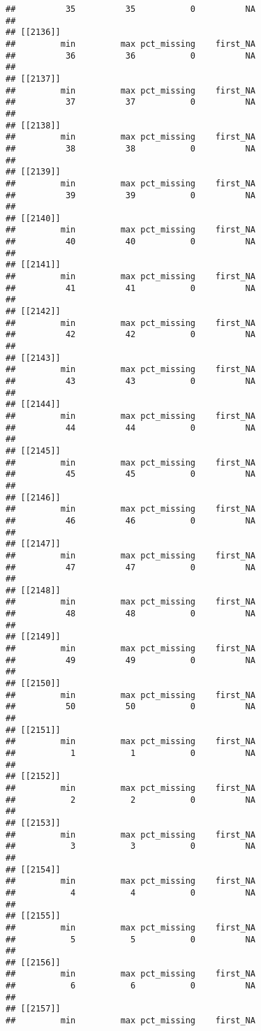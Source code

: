 \documentclass[
]{article}
\begin{document}
\begin{verbatim}
##          35          35           0          NA 
## 
## [[2136]]
##         min         max pct_missing    first_NA 
##          36          36           0          NA 
## 
## [[2137]]
##         min         max pct_missing    first_NA 
##          37          37           0          NA 
## 
## [[2138]]
##         min         max pct_missing    first_NA 
##          38          38           0          NA 
## 
## [[2139]]
##         min         max pct_missing    first_NA 
##          39          39           0          NA 
## 
## [[2140]]
##         min         max pct_missing    first_NA 
##          40          40           0          NA 
## 
## [[2141]]
##         min         max pct_missing    first_NA 
##          41          41           0          NA 
## 
## [[2142]]
##         min         max pct_missing    first_NA 
##          42          42           0          NA 
## 
## [[2143]]
##         min         max pct_missing    first_NA 
##          43          43           0          NA 
## 
## [[2144]]
##         min         max pct_missing    first_NA 
##          44          44           0          NA 
## 
## [[2145]]
##         min         max pct_missing    first_NA 
##          45          45           0          NA 
## 
## [[2146]]
##         min         max pct_missing    first_NA 
##          46          46           0          NA 
## 
## [[2147]]
##         min         max pct_missing    first_NA 
##          47          47           0          NA 
## 
## [[2148]]
##         min         max pct_missing    first_NA 
##          48          48           0          NA 
## 
## [[2149]]
##         min         max pct_missing    first_NA 
##          49          49           0          NA 
## 
## [[2150]]
##         min         max pct_missing    first_NA 
##          50          50           0          NA 
## 
## [[2151]]
##         min         max pct_missing    first_NA 
##           1           1           0          NA 
## 
## [[2152]]
##         min         max pct_missing    first_NA 
##           2           2           0          NA 
## 
## [[2153]]
##         min         max pct_missing    first_NA 
##           3           3           0          NA 
## 
## [[2154]]
##         min         max pct_missing    first_NA 
##           4           4           0          NA 
## 
## [[2155]]
##         min         max pct_missing    first_NA 
##           5           5           0          NA 
## 
## [[2156]]
##         min         max pct_missing    first_NA 
##           6           6           0          NA 
## 
## [[2157]]
##         min         max pct_missing    first_NA 

\end{verbatim}
\end{document}
